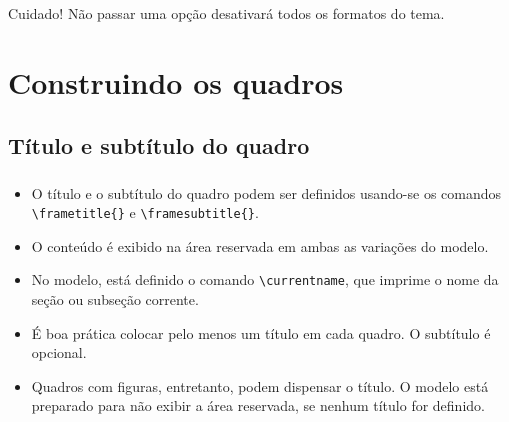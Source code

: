 \documentclass[12pt, xcolor=table, aspectratio=169]{beamer}
\makeatletter
\newcommand*{\currentname}{\@currentlabelname}
\makeatother
\begin{document}
\begin{frame}
 \frametitle{\currentname}
  \begin{alertblock}{Cuidado!}
  Não passar uma opção desativará todos os formatos do tema.
 \end{alertblock}
\end{frame}

\section{Construindo os quadros}

\subsection{Título e subtítulo do quadro}

\begin{frame}
  \frametitle{\currentname}
  \begin{itemize}
    \item O \alert{título} e o \alert{subtítulo} do quadro podem ser definidos usando-se os comandos
          \texttt{{\textbackslash}frametitle\{\}} e \texttt{{\textbackslash}framesubtitle\{\}}.
    \item O conteúdo é exibido na área reservada em ambas as variações do modelo.
    \item No modelo, está definido o comando \texttt{{\textbackslash}currentname}, que imprime o nome da seção ou subseção corrente.
    \item É boa prática colocar pelo menos um título em cada quadro. O subtítulo é opcional.
    \item Quadros com figuras, entretanto, podem dispensar o título. O modelo está preparado para não exibir a área reservada, se nenhum título for definido.
  \end{itemize}
\end{frame}
\end{document}
